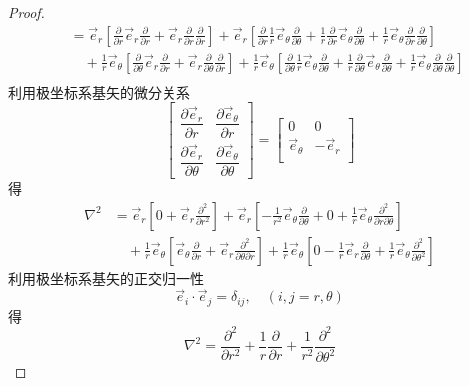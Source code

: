 \begin{proof}
\begin{equation*}
\begin{split}
			&= \vec{e}_{r} [\frac{\partial}{\partial r} \vec{e}_{r} \frac{\partial}{\partial r} +  \vec{e}_{r}\frac{\partial}{\partial r} \frac{\partial}{\partial r}] 
			+ \vec{e}_{r} [\frac{\partial}{\partial r} \frac{1}{r} \vec{e}_{\theta} \frac{\partial}{\partial \theta} + \frac{1}{r} \frac{\partial}{\partial r} \vec{e}_{\theta} \frac{\partial}{\partial \theta} + \frac{1}{r} \vec{e}_{\theta}\frac{\partial}{\partial r}  \frac{\partial}{\partial \theta} ] \\
			~ & \hspace{1em}+ \frac{1}{r}\vec{e}_{\theta} [\frac{\partial}{\partial \theta} \vec{e}_{r} \frac{\partial}{\partial r} + \vec{e}_{r} \frac{\partial}{\partial \theta} \frac{\partial}{\partial r}] + \frac{1}{r} \vec{e}_{\theta} [\frac{\partial}{\partial \theta} \frac{1}{r} \vec{e}_{\theta} \frac{\partial}{\partial \theta} + \frac{1}{r} \frac{\partial}{\partial \theta} \vec{e}_{\theta} \frac{\partial}{\partial \theta} + \frac{1}{r} \vec{e}_{\theta}\frac{\partial}{\partial \theta} \frac{\partial}{\partial \theta}] \\
		\end{split}
		\end{equation*}	
	利用极坐标系基矢的微分关系
	$$\left[\begin{array}{ccc}
		\dfrac{\partial \vec{e}_{r}}{\partial r} &   \dfrac{\partial \vec{e}_{\theta}}{\partial r} \\ 
		\dfrac{\partial \vec{e}_{r}}{\partial \theta} &  \dfrac{\partial \vec{e}_{\theta}}{\partial \theta} 
	\end{array}\right]
	= \left[\begin{array}{ccc}
		0 &  0 \\ 
		\vec{e}_{\theta} & -\vec{e}_{r} \\ 
	\end{array}\right]
	$$
	得
	\begin{equation*}
		\begin{split}
			\nabla ^2
			&= \vec{e}_{r} [0 +  \vec{e}_{r}\frac{\partial^2}{\partial r^2}] 
			+ \vec{e}_{r} [-\frac{1}{r^2} \vec{e}_{\theta} \frac{\partial}{\partial \theta} + 0 + \frac{1}{r} \vec{e}_{\theta}\frac{\partial^2}{\partial r \partial \theta}  ] \\
			~ & \hspace{1em}+ \frac{1}{r}\vec{e}_{\theta} [ \vec{e}_{\theta} \frac{\partial}{\partial r} + \vec{e}_{r} \frac{\partial ^2}{\partial \theta \partial r}] + \frac{1}{r} \vec{e}_{\theta} [0 -\frac{1}{r} \vec{e}_{r} \frac{\partial}{\partial \theta} + \frac{1}{r} \vec{e}_{\theta}\frac{\partial ^2}{\partial \theta ^2}] 
		\end{split}
		\end{equation*}	
	利用极坐标系基矢的正交归一性
	\begin{equation*}
		\vec{e}_{i} \cdot \vec{e}_{j} = \delta_{ij}, \quad (i,j = r,\theta )
	\end{equation*}
	得
	$$
	\nabla ^2 = \frac{\partial ^2 }{\partial r^2 } +\frac{1}{r } \frac{\partial }{\partial r } +
				\frac{1}{r^2 } \frac{\partial ^2 }{\partial \theta ^2 } 
	$$ 
   \end{proof}
	
